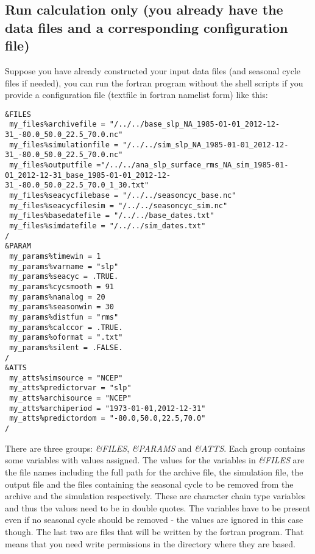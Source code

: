 \documentclass[11p,a4paper]{article}
\begin{document}
\subsection{Run calculation only (you already have the data files and a corresponding configuration file)}
Suppose you have already constructed your input data files (and seasonal cycle files if needed), you can run the fortran program without the shell scripts if you provide a configuration file (textfile in fortran namelist form) like this:
\begin{verbatim}
&FILES
 my_files%archivefile = "/../../base_slp_NA_1985-01-01_2012-12-31_-80.0_50.0_22.5_70.0.nc"
 my_files%simulationfile = "/../../sim_slp_NA_1985-01-01_2012-12-31_-80.0_50.0_22.5_70.0.nc"
 my_files%outputfile ="/../../ana_slp_surface_rms_NA_sim_1985-01-01_2012-12-31_base_1985-01-01_2012-12-31_-80.0_50.0_22.5_70.0_1_30.txt"
 my_files%seacycfilebase = "/../../seasoncyc_base.nc"
 my_files%seacycfilesim = "/../../seasoncyc_sim.nc"
 my_files%basedatefile = "/../../base_dates.txt"
 my_files%simdatefile = "/../../sim_dates.txt"
/
&PARAM
 my_params%timewin = 1
 my_params%varname = "slp"
 my_params%seacyc = .TRUE.
 my_params%cycsmooth = 91
 my_params%nanalog = 20
 my_params%seasonwin = 30
 my_params%distfun = "rms"
 my_params%calccor = .TRUE.
 my_params%oformat = ".txt"
 my_params%silent = .FALSE.
/
&ATTS
 my_atts%simsource = "NCEP"
 my_atts%predictorvar = "slp"
 my_atts%archisource = "NCEP"
 my_atts%archiperiod = "1973-01-01,2012-12-31"
 my_atts%predictordom = "-80.0,50.0,22.5,70.0"
/
\end{verbatim}
There are three groups: \textit{\&FILES}, \textit{\&PARAMS} and \textit{\&ATTS}. Each group contains some variables with values assigned. The values for the variables in \textit{\&FILES} are the file names including the full path for the archive file, the simulation file, the output file and the files containing the seasonal cycle to be removed from the archive and the  simulation respectively. These are character chain type variables and thus the values need to be in double quotes. The variables have to be present even if no seasonal cycle should be removed - the values are ignored in this case though. The last two are files that will be written by the fortran program. That means that you need write permissions in the directory where they are based.
\end{document}
